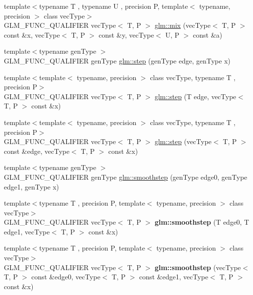 \begin{DoxyCompactItemize}
\item 
{\footnotesize template$<$typename T , typename U , precision P, template$<$ typename, precision $>$ class vec\-Type$>$ }\\G\-L\-M\-\_\-\-F\-U\-N\-C\-\_\-\-Q\-U\-A\-L\-I\-F\-I\-E\-R vec\-Type$<$ T, P $>$ \hyperlink{group__core__func__common_gadccbaffe46f369cf1a96b2aef92cbfdd}{glm\-::mix} (vec\-Type$<$ T, P $>$ const \&x, vec\-Type$<$ T, P $>$ const \&y, vec\-Type$<$ U, P $>$ const \&a)
\item 
{\footnotesize template$<$typename gen\-Type $>$ }\\G\-L\-M\-\_\-\-F\-U\-N\-C\-\_\-\-Q\-U\-A\-L\-I\-F\-I\-E\-R gen\-Type \hyperlink{group__core__func__common_ga015a1261ff23e12650211aa872863cce}{glm\-::step} (gen\-Type edge, gen\-Type x)
\item 
{\footnotesize template$<$template$<$ typename, precision $>$ class vec\-Type, typename T , precision P$>$ }\\G\-L\-M\-\_\-\-F\-U\-N\-C\-\_\-\-Q\-U\-A\-L\-I\-F\-I\-E\-R vec\-Type$<$ T, P $>$ \hyperlink{group__core__func__common_gaf15b74ab672af2c7d7b535a9b4803700}{glm\-::step} (T edge, vec\-Type$<$ T, P $>$ const \&x)
\item 
{\footnotesize template$<$template$<$ typename, precision $>$ class vec\-Type, typename T , precision P$>$ }\\G\-L\-M\-\_\-\-F\-U\-N\-C\-\_\-\-Q\-U\-A\-L\-I\-F\-I\-E\-R vec\-Type$<$ T, P $>$ \hyperlink{group__core__func__common_ga6d84170051fb87c183c38883ec85b411}{glm\-::step} (vec\-Type$<$ T, P $>$ const \&edge, vec\-Type$<$ T, P $>$ const \&x)
\item 
{\footnotesize template$<$typename gen\-Type $>$ }\\G\-L\-M\-\_\-\-F\-U\-N\-C\-\_\-\-Q\-U\-A\-L\-I\-F\-I\-E\-R gen\-Type \hyperlink{group__core__func__common_ga562edf7eca082cc5b7a0aaf180436daf}{glm\-::smoothstep} (gen\-Type edge0, gen\-Type edge1, gen\-Type x)
\item 
\hypertarget{group__core__func__common_gaeb3d9cf6e832b6d0000cd76e04cef682}{{\footnotesize template$<$typename T , precision P, template$<$ typename, precision $>$ class vec\-Type$>$ }\\G\-L\-M\-\_\-\-F\-U\-N\-C\-\_\-\-Q\-U\-A\-L\-I\-F\-I\-E\-R vec\-Type$<$ T, P $>$ {\bfseries glm\-::smoothstep} (T edge0, T edge1, vec\-Type$<$ T, P $>$ const \&x)}\label{group__core__func__common_gaeb3d9cf6e832b6d0000cd76e04cef682}

\item 
\hypertarget{group__core__func__common_ga8b9b9ba3425d603118cf90aee8b32bd6}{{\footnotesize template$<$typename T , precision P, template$<$ typename, precision $>$ class vec\-Type$>$ }\\G\-L\-M\-\_\-\-F\-U\-N\-C\-\_\-\-Q\-U\-A\-L\-I\-F\-I\-E\-R vec\-Type$<$ T, P $>$ {\bfseries glm\-::smoothstep} (vec\-Type$<$ T, P $>$ const \&edge0, vec\-Type$<$ T, P $>$ const \&edge1, vec\-Type$<$ T, P $>$ const \&x)}\label{group__core__func__common_ga8b9b9ba3425d603118cf90aee8b32bd6}


\end{DoxyCompactItemize}

